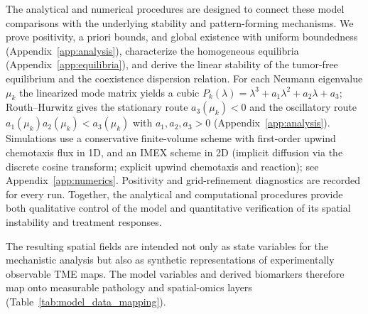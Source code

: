 \documentclass[]{interact}
\theoremstyle{plain}%
\theoremstyle{definition}
\theoremstyle{remark}
\begin{document}
The analytical and numerical procedures are designed to connect these model
comparisons with the underlying stability and pattern-forming mechanisms. We
prove positivity, a priori bounds, and global existence with uniform
boundedness (Appendix~\ref{app:analysis}), characterize the homogeneous
equilibria (Appendix~\ref{app:equilibria}), and derive the linear stability of
the tumor-free equilibrium and the coexistence dispersion relation. For each
Neumann eigenvalue $\mu_k$ the linearized mode matrix yields a cubic
$P_k(\lambda)=\lambda^3+a_1\lambda^2+a_2\lambda+a_3$; Routh--Hurwitz gives the
stationary route $a_3(\mu_k)<0$ and the oscillatory route
$a_1(\mu_k)a_2(\mu_k)<a_3(\mu_k)$ with $a_1,a_2,a_3>0$
(Appendix~\ref{app:analysis}). Simulations use a conservative finite-volume
scheme with first-order upwind chemotaxis flux in 1D, and an IMEX scheme in 2D
(implicit diffusion via the discrete cosine transform; explicit upwind
chemotaxis and reaction); see Appendix~\ref{app:numerics}. Positivity and
grid-refinement diagnostics are recorded for every run. Together, the analytical and
computational procedures provide both qualitative control of the model and
quantitative verification of its spatial instability and treatment responses.

The resulting spatial fields are intended not only as state variables for the
mechanistic analysis but also as synthetic representations of experimentally
observable TME maps. The model variables and derived biomarkers therefore map
onto measurable pathology and spatial-omics layers (Table~\ref{tab:model_data_mapping}).
\end{document}
